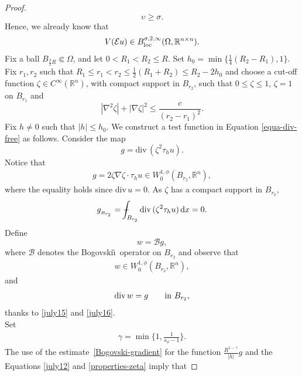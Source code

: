 \documentclass[leqno,11pt]{amsart}%
\numberwithin{equation}{section}
\newcommand{\dive}{\mathrm{div}\,}
\def\R{\mathbb R}
\def\Rn{{\mathbb R}^{n}}
\def\rn{\Rn}
\def\d{\mathrm{d}}
\def\dx{\d x}
\theoremstyle{definition}
\newcommand{\xint}[3]{{\setbox0=\hbox{$#1{#2#3}{\int}$}
   \vcenter{\hbox{$#2#3$}}\kern-.5\wd0}}
\newcommand{\mint}{\mathchoice
   {\xint\displaystyle\textstyle-}
   {\xint\textstyle\scriptstyle-}
   {\xint\scriptstyle\scriptscriptstyle-}
   {\xint\scriptscriptstyle\scriptscriptstyle-}
   \!\int}
\numberwithin{equation}{section}
\begin{document}
\begin{proof}
\begin{equation}
\upsilon \geq \sigma.
\end{equation}
Hence, we already know that
\begin{align}\label{july25}
    V(\mathcal E u)\in B^{\sigma, 2, \infty}_{\rm loc}(\Omega, \mathbb R^{n\times n}).
\end{align}
Fix a ball 
$B_{ \frac32R}\Subset\Omega$, and let $0< R_1<R_2\le R$.  Set  $h_0=\min\{{\frac14}(R_2-R_1),1\}$.
  Fix $r_1,r_2$ such that
  $R_1\le r_1<r_2
  \le
  \frac12(R_1+R_2)
  {\le}
  R_2-{2}h_0$ and choose a cut-off function $\zeta\in
  C^\infty (\mathbb R^n)$, with compact support in $B_{r_2}$, such that $0\leq \zeta \leq 1$, $\zeta=1$ on $B_{r_1}$ and
  \begin{equation}\label{properties-zeta}
    |\nabla ^2\zeta|+|\nabla\zeta|^2\le\frac{c}{(r_2-r_1)^2}.
  \end{equation}
Fix $h\neq0$ such that $|h|\le h_0$. We 
  construct a test function  in   Equation \eqref{equa-div-free} as follows.
  Consider the map
\begin{equation}\label{definition-g}
g=\dive(\zeta^2\tau_hu).
  \end{equation}
  Notice that
\begin{align}
    \label{july12}
g=2\zeta\nabla\zeta\cdot\tau_hu\in W^{1,\phi}_0(B_{r_2}, \rn),
\end{align}
  where the equality holds since $\dive u=0$. As $\zeta$ has a compact support in $B_{r_2}$,
  \begin{equation*}
g_{_{B_{r_2}}}=\mint_{B_{r_2}}\dive(\zeta^2\tau_hu)\,\dx=0.
  \end{equation*}
  Define
  \begin{equation*}
    w=\mathcal{B}g,
  \end{equation*}
  where $\mathcal{B}$ denotes the Bogovski\u\i\ operator on $B_{r_2}$
  and observe that
\begin{align}
    \label{july14}
    w\in W^{1,\phi}_0(B_{r_2},\R^n),
\end{align}
  and 
\begin{equation}\label{choice-w-1}
     \dive w=g\mbox{\qquad in }B_{r_2},
  \end{equation}
   thanks to \eqref{july15} and \eqref{july16}.
 \\ Set 
 \begin{align}\label{gamma}
     \gamma=\min\Big\{1,\frac1{s_\phi-1}\Big\}.
 \end{align} 
 The use  of the
estimate~\eqref{Bogovski-gradient} for the function
  $\frac{R^{1-\gamma}}{|h|}g$ and the Equations \eqref{july12} and \eqref{properties-zeta}  imply that  

\end{proof}
\end{document}
